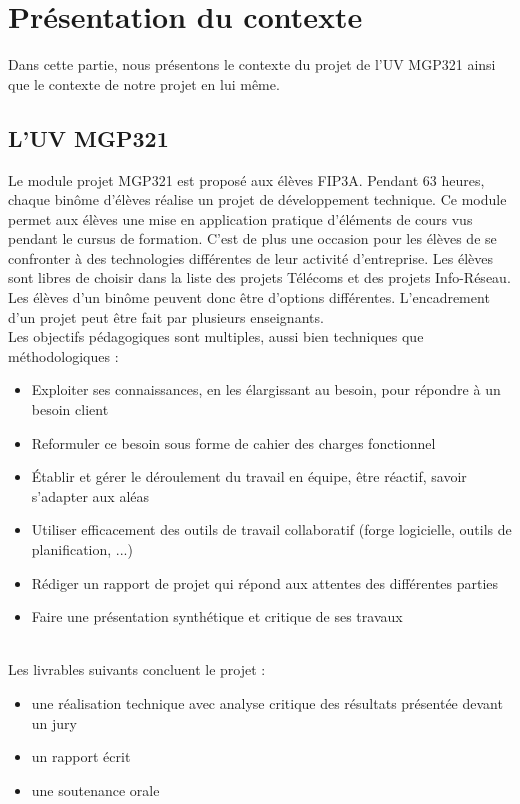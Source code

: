 \chapter{Présentation du contexte}

Dans cette partie, nous présentons le contexte du projet de l'UV MGP321 ainsi que le contexte de notre projet en lui même.

\section{L'UV MGP321}

Le module projet \gls{MGP}321 est proposé aux élèves {FIP}3A. Pendant 63 heures, chaque binôme d'élèves réalise un projet de développement technique. Ce module permet aux élèves une mise en application pratique d'éléments de cours vus pendant le cursus de formation. C'est de plus une occasion pour les élèves de se confronter à des technologies différentes de leur activité d'entreprise. Les élèves sont libres de choisir dans la liste des projets Télécoms et des projets Info-Réseau. Les élèves d'un binôme peuvent donc être d'options différentes. L'encadrement d'un projet peut être fait par plusieurs enseignants.\\ 

Les objectifs pédagogiques sont multiples, aussi bien techniques que méthodologiques : \\

\begin{itemize}
    \item Exploiter ses connaissances, en les élargissant au besoin, pour répondre à un besoin client

\item Reformuler ce besoin sous forme de cahier des charges fonctionnel
\item Établir et gérer le déroulement du travail en équipe, être réactif, savoir s'adapter aux aléas
\item Utiliser efficacement des outils de travail collaboratif (forge logicielle, outils de planification, ...)
\item Rédiger un rapport de projet qui répond aux attentes des différentes parties
\item Faire une présentation synthétique et critique de ses travaux \\

\end{itemize}

\par
\\ Les livrables suivants concluent le projet : \\
\begin{itemize}
    

\item une réalisation technique avec analyse critique des résultats présentée devant un jury
\item un rapport écrit
\item une soutenance orale
\end{itemize}

